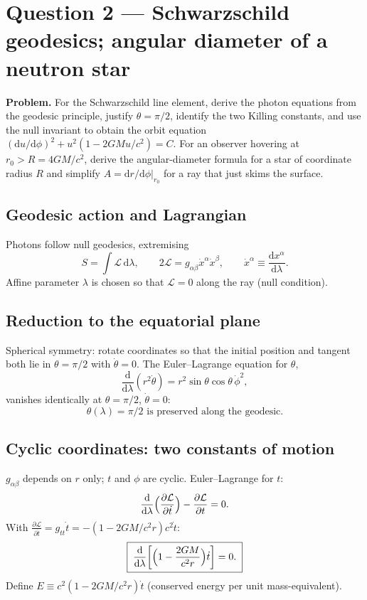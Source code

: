 \documentclass[11pt]{article}
\newcommand{\de}{\mathrm{d}}
\newcommand{\pd}[2]{\frac{\partial #1}{\partial #2}}
\begin{document}
\section*{Question 2 --- Schwarzschild geodesics; angular diameter of a neutron star}

\textbf{Problem.} For the Schwarzschild line element, derive the photon equations from the geodesic principle, justify $\theta=\pi/2$, identify the two Killing constants, and use the null invariant to obtain the orbit equation $(\de u/\de\phi)^{2}+u^{2}(1-2GMu/c^{2})=C$. For an observer hovering at $r_{0}>R=4GM/c^{2}$, derive the angular-diameter formula for a star of coordinate radius $R$ and simplify $A=\de r/\de\phi|_{r_{0}}$ for a ray that just skims the surface.

\subsection*{Geodesic action and Lagrangian}

Photons follow null geodesics, extremising
\[ S = \int \mathcal L\,\de\lambda,\qquad 2\mathcal L = g_{\alpha\beta}\dot x^{\alpha}\dot x^{\beta},\qquad \dot x^{\alpha}\equiv\frac{\de x^{\alpha}}{\de\lambda}. \]
Affine parameter $\lambda$ is chosen so that $\mathcal L=0$ along the ray (null condition).

\subsection*{Reduction to the equatorial plane}

Spherical symmetry: rotate coordinates so that the initial position and tangent both lie in $\theta=\pi/2$ with $\dot\theta=0$. The Euler--Lagrange equation for $\theta$,
\[ \frac{\de}{\de\lambda}(r^{2}\dot\theta) = r^{2}\sin\theta\cos\theta\,\dot\phi^{2}, \]
vanishes identically at $\theta=\pi/2$, $\dot\theta=0$:
\[ \boxed{\;\theta(\lambda)=\pi/2\text{ is preserved along the geodesic.}\;} \]

\subsection*{Cyclic coordinates: two constants of motion}

$g_{\alpha\beta}$ depends on $r$ only; $t$ and $\phi$ are cyclic. Euler--Lagrange for $t$:
\[ \frac{\de}{\de\lambda}\Bigl(\pd{\mathcal L}{\dot t}\Bigr) - \pd{\mathcal L}{t} = 0. \]
With $\pd{\mathcal L}{\dot t}=g_{tt}\dot t = -(1-2GM/c^{2}r)c^{2}\dot t$:
\[ \boxed{\;\frac{\de}{\de\lambda}\!\left[\Bigl(1-\frac{2GM}{c^{2}r}\Bigr)\dot t\right] = 0.\;} \]
Define $E\equiv c^{2}(1-2GM/c^{2}r)\dot t$ (conserved energy per unit mass-equivalent).
\end{document}
